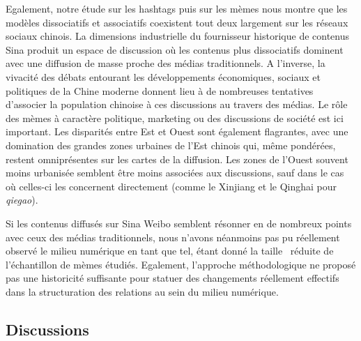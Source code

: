 Egalement, notre \'etude sur les hashtags puis sur les m\`emes nous montre que les mod\`eles dissociatifs et associatifs coexistent tout deux largement sur les r\'eseaux sociaux chinois. La dimensions industrielle du fournisseur historique de contenus Sina produit un espace de discussion o\`u les contenus plus dissociatifs dominent avec une diffusion de masse proche des m\'edias traditionnels. A l{\textquoteright}inverse, la vivacit\'e des d\'ebats entourant les d\'eveloppements \'economiques, sociaux et politiques de la Chine moderne donnent lieu \`a de nombreuses tentatives d{\textquoteright}associer la population chinoise \`a ces discussions au travers des m\'edias. Le r\^ole des m\`emes \`a caract\`ere politique, marketing ou des discussions de soci\'et\'e est ici important. Les disparit\'es entre Est et Ouest sont \'egalement flagrantes, avec une domination des grandes zones urbaines de l{\textquoteright}Est chinois qui, m\^eme pond\'er\'ees, restent omnipr\'esentes sur les cartes de la diffusion. Les zones de l{\textquoteright}Ouest souvent moins urbanis\'ee semblent \^etre moins associ\'ees aux discussions, sauf dans le cas o\`u celles-ci les concernent directement (comme le Xinjiang et le Qinghai pour \textit{qiegao}).

Si les contenus diffus\'es sur Sina Weibo semblent r\'esonner en de nombreux points avec ceux des m\'edias traditionnels, nous n{\textquoteright}avons n\'eanmoins pas pu r\'eellement observ\'e le milieu num\'erique en tant que tel, \'etant donn\'e la taille \ r\'eduite de l{\textquoteright}\'echantillon de m\`emes \'etudi\'es. Egalement, l{\textquoteright}approche m\'ethodologique ne propos\'e pas une historicit\'e suffisante pour statuer des changements r\'eellement effectifs dans la structuration des relations au sein du milieu num\'erique.
 

\subsection[Discussions]{Discussions}
% 
% 
% 
 
